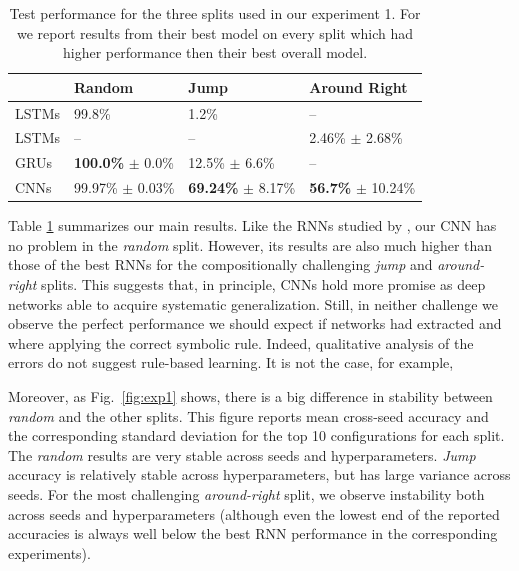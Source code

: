 \begin{table}[t!]
    \footnotesize
    \centering
        \begin{tabular}{l |l| l | l}
             & \textbf{Random} & \textbf{Jump} & \textbf{Around Right} \\ \hline
             LSTMs \cite{Lake:Baroni:2017} & 99.8\% & 1.2\% & -- \\
             LSTMs \cite{Loula:etal:2018} & -- & -- &  2.46\% $\pm$ 2.68\% \\
             GRUs \cite{Bastings:etal:2018} & \textbf{100.0\%} $\pm$ 0.0\% & 12.5\% $\pm$ 6.6\% & --  \\
             \hline
             CNNs & 99.97\% $\pm$ 0.03\% & \textbf{69.24\%} $\pm$ 8.17\%  & \textbf{56.7\%} $\pm$ 10.24\% \\
        \end{tabular}
    \caption{\label{table:main results}  Test performance for the three splits used in our experiment 1. For  
    we report results from their best model on every split
    which had higher performance then their best overall model.}
\end{table}



Table \ref{table:main results} summarizes our main results. Like the RNNs studied by
, our CNN has no problem in the
\emph{random} split. However, its results are also much higher than
those of the best RNNs for the compositionally challenging \emph{jump}
and \emph{around-right} splits. This suggests that, in principle, CNNs
hold more promise as deep networks able to acquire systematic
generalization. Still, in neither challenge we observe the perfect
performance we should expect if networks had extracted and where
applying the correct symbolic rule. Indeed, qualitative analysis of
the errors do not suggest rule-based learning. It is not the case, for
example, 

Moreover, as Fig.~\ref{fig:exp1} shows, there is a big difference in
stability between \emph{random} and the other splits. This figure
reports mean cross-seed accuracy and the corresponding standard
deviation for the top 10 configurations for each split. The
\emph{random} results are very stable across seeds and
hyperparameters. \emph{Jump} accuracy is relatively stable across
hyperparameters, but has large variance across seeds. For the most
challenging \emph{around-right} split, we observe instability both
across seeds and hyperparameters (although even the lowest end of the
reported accuracies is always well below the best RNN performance in
the corresponding experiments).

